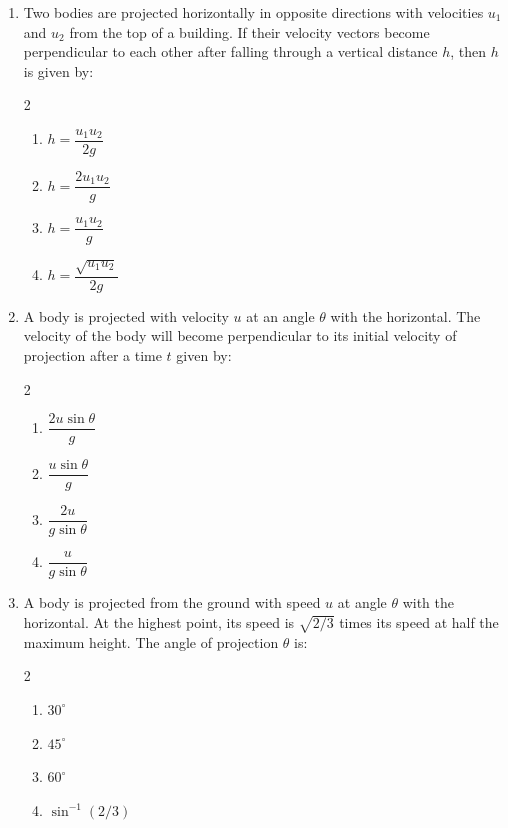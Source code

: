 \documentclass[11pt,a4paper]{article}
\begin{document}
\begin{enumerate}[label=\textbf{\textcolor{l2Amber}{Q\arabic*.}},leftmargin=24pt,itemsep=10pt,start=26]
  \item Two bodies are projected horizontally in opposite directions with velocities $u_1$ and $u_2$ from the top of a building. If their velocity vectors become perpendicular to each other after falling through a vertical distance $h$, then $h$ is given by:
  \begin{multicols}{2}
  \begin{enumerate}[label=\textbf{\textcolor{primaryDark}{(\Alph*)}},itemsep=2pt]
    \item $h = \dfrac{u_1 u_2}{2g}$
    \item $h = \dfrac{2u_1 u_2}{g}$
    \item $h = \dfrac{u_1 u_2}{g}$
    \item $h = \dfrac{\sqrt{u_1 u_2}}{2g}$
  \end{enumerate}
  \end{multicols}

  \item A body is projected with velocity $u$ at an angle $\theta$ with the horizontal. The velocity of the body will become perpendicular to its initial velocity of projection after a time $t$ given by:
  \begin{multicols}{2}
  \begin{enumerate}[label=\textbf{\textcolor{primaryDark}{(\Alph*)}},itemsep=2pt]
    \item $\dfrac{2u\sin\theta}{g}$
    \item $\dfrac{u\sin\theta}{g}$
    \item $\dfrac{2u}{g\sin\theta}$
    \item $\dfrac{u}{g\sin\theta}$
  \end{enumerate}
  \end{multicols}

  \item A body is projected from the ground with speed $u$ at angle $\theta$ with the horizontal. At the highest point, its speed is $\sqrt{2/3}$ times its speed at half the maximum height. The angle of projection $\theta$ is:
  \begin{multicols}{2}
  \begin{enumerate}[label=\textbf{\textcolor{primaryDark}{(\Alph*)}},itemsep=2pt]
    \item $30^\circ$
    \item $45^\circ$
    \item $60^\circ$
    \item $\sin^{-1}(2/3)$
  \end{enumerate}
  \end{multicols}


\end{enumerate}
\end{document}
